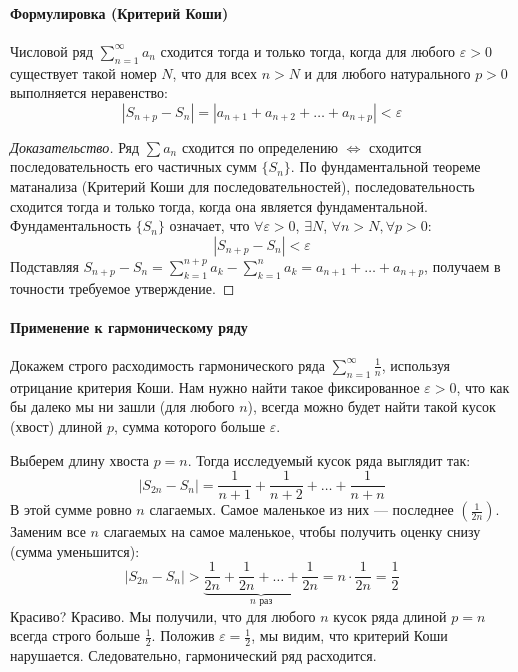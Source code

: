 \paragraph{Формулировка (Критерий Коши)}
Числовой ряд $\sum_{n=1}^\infty a_n$ сходится тогда и только тогда, когда для любого $\varepsilon > 0$ существует такой номер $N$, что для всех $n > N$ и для любого натурального $p > 0$ выполняется неравенство:
$$|S_{n+p} - S_n| = |a_{n+1} + a_{n+2} + \dots + a_{n+p}| < \varepsilon$$

\begin{proof}[Доказательство]
Ряд $\sum a_n$ сходится по определению $\iff$ сходится последовательность его частичных сумм $\{S_n\}$. 
По фундаментальной теореме матанализа (Критерий Коши для последовательностей), последовательность сходится тогда и только тогда, когда она является фундаментальной.
Фундаментальность $\{S_n\}$ означает, что $\forall \varepsilon > 0$, $\exists N$, $\forall n > N, \forall p > 0$:
$$|S_{n+p} - S_n| < \varepsilon$$
Подставляя $S_{n+p} - S_n = \sum_{k=1}^{n+p} a_k - \sum_{k=1}^n a_k = a_{n+1} + \dots + a_{n+p}$, получаем в точности требуемое утверждение.
\end{proof}

\paragraph{Применение к гармоническому ряду}
Докажем строго расходимость гармонического ряда $\sum_{n=1}^\infty \frac{1}{n}$, используя отрицание критерия Коши. Нам нужно найти такое фиксированное $\varepsilon > 0$, что как бы далеко мы ни зашли (для любого $n$), всегда можно будет найти такой кусок (хвост) длиной $p$, сумма которого больше $\varepsilon$.

Выберем длину хвоста $p = n$. Тогда исследуемый кусок ряда выглядит так:
$$|S_{2n} - S_n| = \frac{1}{n+1} + \frac{1}{n+2} + \dots + \frac{1}{n+n}$$
В этой сумме ровно $n$ слагаемых. Самое маленькое из них — последнее $\left(\frac{1}{2n}\right)$.
Заменим все $n$ слагаемых на самое маленькое, чтобы получить оценку снизу (сумма уменьшится):
$$|S_{2n} - S_n| > \underbrace{\frac{1}{2n} + \frac{1}{2n} + \dots + \frac{1}{2n}}_{n \text{ раз}} = n \cdot \frac{1}{2n} = \frac{1}{2}$$
Красиво? Красиво.
Мы получили, что для любого $n$ кусок ряда длиной $p=n$ всегда строго больше $\frac{1}{2}$. Положив $\varepsilon = \frac{1}{2}$, мы видим, что критерий Коши нарушается. Следовательно, гармонический ряд расходится.

